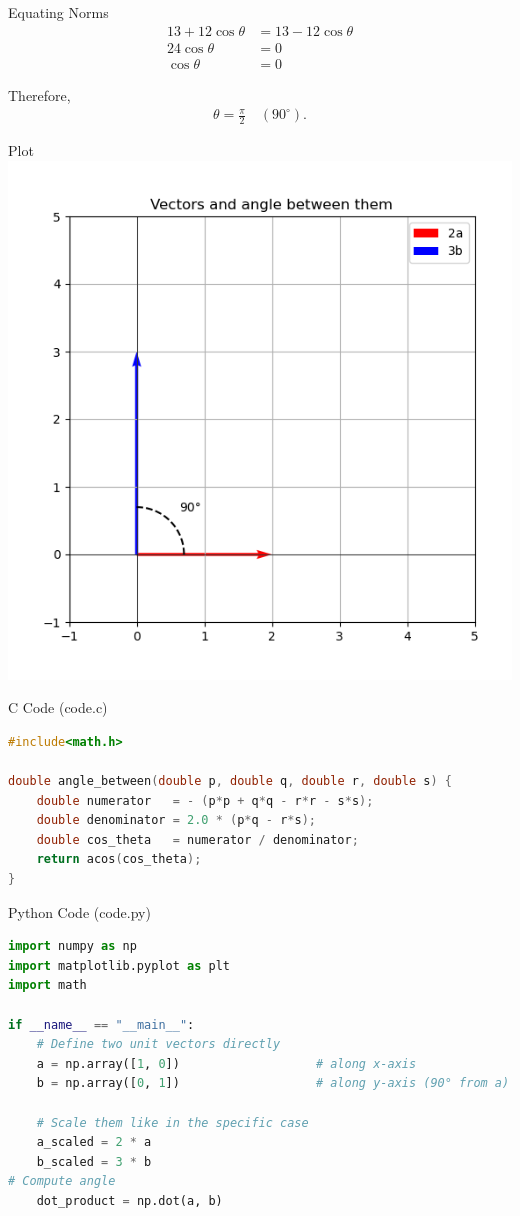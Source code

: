\documentclass{beamer}
\begin{document}
\begin{frame}{Equating Norms}
\begin{align}
13 + 12\cos\theta &= 13 - 12\cos\theta \\
24\cos\theta &= 0 \\
\cos\theta &= 0
\end{align}

Therefore,
\begin{align*}
\theta = \frac{\pi}{2} \quad (90^\circ).
\end{align*}
\end{frame}

\begin{frame}{Plot}
\centering
\includegraphics[width=0.8\linewidth]{figs/fig.png}
\end{frame}
\begin{frame}[fragile]{C Code (code.c)}
\begin{lstlisting}[language=C]
#include<math.h>

double angle_between(double p, double q, double r, double s) {
    double numerator   = - (p*p + q*q - r*r - s*s);
    double denominator = 2.0 * (p*q - r*s);
    double cos_theta   = numerator / denominator;
    return acos(cos_theta);
}
\end{lstlisting}
\end{frame}
\begin{frame}[fragile]{Python Code (code.py)}
\begin{lstlisting}[language=Python]
import numpy as np
import matplotlib.pyplot as plt
import math

if __name__ == "__main__":
    # Define two unit vectors directly
    a = np.array([1, 0])                   # along x-axis
    b = np.array([0, 1])                   # along y-axis (90° from a)

    # Scale them like in the specific case
    a_scaled = 2 * a
    b_scaled = 3 * b
# Compute angle
    dot_product = np.dot(a, b)
\end{lstlisting}
\end{frame}
\end{document}
